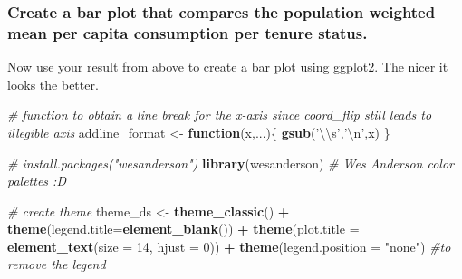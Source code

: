 \documentclass[
]{article}
\newenvironment{Shaded}{\begin{snugshade}}{\end{snugshade}}
\newcommand{\CharTok}[1]{\textcolor[rgb]{0.31,0.60,0.02}{#1}}
\newcommand{\CommentTok}[1]{\textcolor[rgb]{0.56,0.35,0.01}{\textit{#1}}}
\newcommand{\ControlFlowTok}[1]{\textcolor[rgb]{0.13,0.29,0.53}{\textbf{#1}}}
\newcommand{\DataTypeTok}[1]{\textcolor[rgb]{0.13,0.29,0.53}{#1}}
\newcommand{\DecValTok}[1]{\textcolor[rgb]{0.00,0.00,0.81}{#1}}
\newcommand{\KeywordTok}[1]{\textcolor[rgb]{0.13,0.29,0.53}{\textbf{#1}}}
\newcommand{\NormalTok}[1]{#1}
\newcommand{\OperatorTok}[1]{\textcolor[rgb]{0.81,0.36,0.00}{\textbf{#1}}}
\newcommand{\StringTok}[1]{\textcolor[rgb]{0.31,0.60,0.02}{#1}}
\begin{document}
\hypertarget{create-a-bar-plot-that-compares-the-population-weighted-mean-per-capita-consumption-per-tenure-status.}{%
\subsubsection{Create a bar plot that compares the population weighted
mean per capita consumption per tenure
status.}\label{create-a-bar-plot-that-compares-the-population-weighted-mean-per-capita-consumption-per-tenure-status.}}

Now use your result from above to create a bar plot using ggplot2. The
nicer it looks the better.

\begin{Shaded}
\begin{Highlighting}[]
\CommentTok{# function to obtain a line break for the x-axis since coord_flip still leads to illegible axis}
\NormalTok{addline_format <-}\StringTok{ }\ControlFlowTok{function}\NormalTok{(x,...)\{ }
    \KeywordTok{gsub}\NormalTok{(}\StringTok{'}\CharTok{\textbackslash{}\textbackslash{}}\StringTok{s'}\NormalTok{,}\StringTok{'}\CharTok{\textbackslash{}n}\StringTok{'}\NormalTok{,x) }
\NormalTok{\} }

\CommentTok{# install.packages("wesanderson")}
\KeywordTok{library}\NormalTok{(wesanderson) }\CommentTok{# Wes Anderson color palettes :D}

\CommentTok{# create theme}
\NormalTok{theme_ds <-}\StringTok{ }\KeywordTok{theme_classic}\NormalTok{() }\OperatorTok{+}\StringTok{ }
\StringTok{  }\KeywordTok{theme}\NormalTok{(}\DataTypeTok{legend.title=}\KeywordTok{element_blank}\NormalTok{()) }\OperatorTok{+}
\StringTok{  }\KeywordTok{theme}\NormalTok{(}\DataTypeTok{plot.title =} \KeywordTok{element_text}\NormalTok{(}\DataTypeTok{size =} \DecValTok{14}\NormalTok{, }\DataTypeTok{hjust =} \DecValTok{0}\NormalTok{)) }\OperatorTok{+}
\StringTok{  }\KeywordTok{theme}\NormalTok{(}\DataTypeTok{legend.position =} \StringTok{"none"}\NormalTok{) }\CommentTok{#to remove the legend}


\end{Highlighting}
\end{Shaded}
\end{document}

